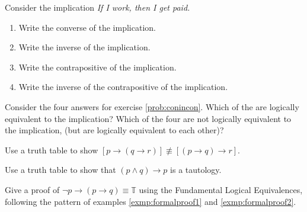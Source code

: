 \begin{prob} Consider the implication {\itshape If I work, then I get paid. }
\label{prob:conincon} 
\begin{enumerate}[label= \alph*)]
\item Write the converse of the implication.
\item Write the inverse of the implication.
\item Write the contrapositive of the implication.
\item Write the inverse of the contrapositive of the implication.
\end{enumerate}
\end{prob}

\begin{prob} Consider the four answers for exercise \ref{prob:conincon}.
Which of the are logically equivalent to the implication?
Which of the four are not logically equivalent to the implication, (but are
logically equivalent to each other)?
\end{prob}

\begin{prob}
Use a truth table to show $[p\to (q\to r)]\not\equiv [(p\to q)\to r]$.
\end{prob}

\begin{prob}
 Use a truth table to show that $(p\land q)\to p$ is a  tautology.
\end{prob}

\begin{prob}
Give a proof of $\lnot p\to(p\to q)\equiv \mathbb{T}$ using the Fundamental Logical Equivalences, following the pattern of examples \ref{exmp:formalproof1} and \ref{exmp:formalproof2}.
\end{prob}




